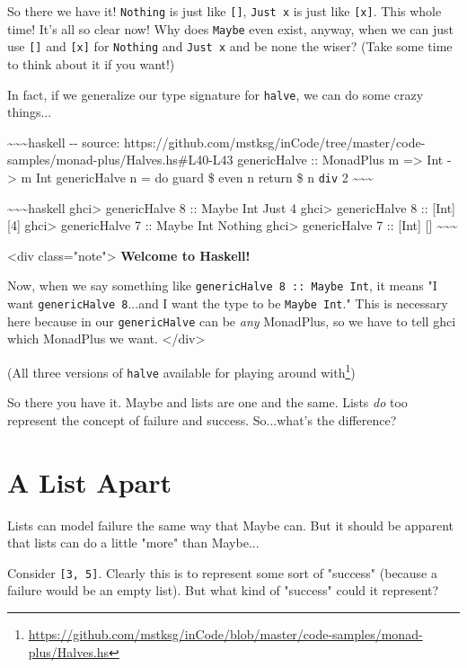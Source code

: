 \documentclass[]{article}
\renewcommand{\href}[2]{#2\footnote{\url{#1}}}
\begin{document}
So there we have it! \texttt{Nothing} is just like \texttt{{[}{]}},
\texttt{Just\ x} is just like \texttt{{[}x{]}}. This whole time! It's all so
clear now! Why does \texttt{Maybe} even exist, anyway, when we can just use
\texttt{{[}{]}} and \texttt{{[}x{]}} for \texttt{Nothing} and \texttt{Just\ x}
and be none the wiser? (Take some time to think about it if you want!)

In fact, if we generalize our type signature for \texttt{halve}, we can do some
crazy things...

\textasciitilde{}\textasciitilde{}\textasciitilde{}haskell -\/- source:
https://github.com/mstksg/inCode/tree/master/code-samples/monad-plus/Halves.hs\#L40-L43
genericHalve :: MonadPlus m =\textgreater{} Int -\textgreater{} m Int
genericHalve n = do guard \$ even n return \$ n \texttt{div} 2
\textasciitilde{}\textasciitilde{}\textasciitilde{}

\textasciitilde{}\textasciitilde{}\textasciitilde{}haskell ghci\textgreater{}
genericHalve 8 :: Maybe Int Just 4 ghci\textgreater{} genericHalve 8 ::
{[}Int{]} {[}4{]} ghci\textgreater{} genericHalve 7 :: Maybe Int Nothing
ghci\textgreater{} genericHalve 7 :: {[}Int{]} {[}{]}
\textasciitilde{}\textasciitilde{}\textasciitilde{}

\textless{}div class="note"\textgreater{} \textbf{Welcome to Haskell!}

Now, when we say something like \texttt{genericHalve\ 8\ ::\ Maybe\ Int}, it
means "I want \texttt{genericHalve\ 8}...and I want the type to be
\texttt{Maybe\ Int}." This is necessary here because in our
\texttt{genericHalve} can be \emph{any} MonadPlus, so we have to tell ghci which
MonadPlus we want. \textless{}/div\textgreater{}

(\href{https://github.com/mstksg/inCode/blob/master/code-samples/monad-plus/Halves.hs}{All
three versions of \texttt{halve} available for playing around with})

So there you have it. Maybe and lists are one and the same. Lists \emph{do} too
represent the concept of failure and success. So...what's the difference?

\section{A List Apart}

Lists can model failure the same way that Maybe can. But it should be apparent
that lists can do a little "more" than Maybe...

Consider \texttt{{[}3,\ 5{]}}. Clearly this is to represent some sort of
"success" (because a failure would be an empty list). But what kind of "success"
could it represent?
\end{document}

